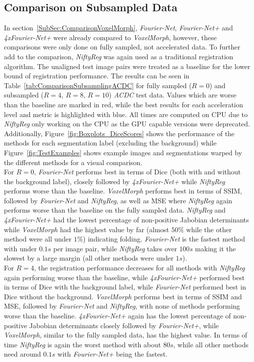 \documentclass[english,version-2022-01]{uzl-thesis} %
\begin{document}
\subsection{Comparison on Subsampled Data} \label{SubSec:ResultsComparisonSubsampling}
In section~\ref{SubSec:ComparisonVoxelMorph}, \emph{Fourier-Net}, \emph{Fourier-Net+} and \emph{4xFourier-Net+} were already compared to \emph{VoxelMorph}, however, these comparisons were only done on fully sampled, not accelerated data. To further add to the comparison, \emph{NiftyReg} was again used as a traditional registration algorithm. The unaligned test image pairs were treated as a baseline for the lower bound of registration performance. The results can be seen in Table~\ref{tab:ComparisonSubsamplingACDC} for fully sampled ($R=0$) and subsampled ($R=4$, $R=8$, $R=10$) \emph{ACDC} test data. Values which are worse than the baseline are marked in red, while the best results for each acceleration level and metric is highlighted with blue. All times are computed on CPU due to \emph{NiftyReg} only working on the CPU as the GPU capable versions were deprecated. Additionally, Figure~\ref{fig:Boxplots_DiceScores} shows the performance of the methods for each segmentation label (excluding the background) while Figure~\ref{fig:TestExamples} shows example images and segmentations warped by the different methods for a visual comparison.\\
For $R=0$, \emph{Fourier-Net} performs best in terms of Dice (both with and without the background label), closely followed by \emph{4xFourier-Net+} while \emph{NiftyReg} performs worse than the baseline. \emph{VoxelMorph} performs best in terms of SSIM, followed by \emph{Fourier-Net} and \emph{NiftyReg}, as well as MSE where \emph{NiftyReg} again performs worse than the baseline on the fully sampled data. \emph{NiftyReg} and \emph{4xFourier-Net+} had the lowest percentage of non-positive Jabobian determinants while \emph{VoxelMorph} had the highest value by far (almost $50\%$ while the other method were all under $1\%$) indicating folding. \emph{Fourier-Net} is the fastest method with under $0.1s$ per image pair, while \emph{NiftyReg} takes over $100s$ making it the slowest by a large margin (all other methods were under $1s$).\\
For $R=4$, the registration performance decreases for all methods with \emph{NiftyReg} again performing worse than the baseline, while \emph{4xFourier-Net+} performed best in terms of Dice with the background label, while \emph{Fourier-Net} performed best in Dice without the background. \emph{VoxelMorph} performs best in terms of SSIM and MSE, followed by \emph{Fourier-Net} and \emph{NiftyReg}, with none of methods performing worse than the baseline. \emph{4xFourier-Net+} again has the lowest percentage of non-positive Jabobian determinants closely followed by \emph{Fourier-Net+}, while \emph{VoxelMorph}, similar to the fully sampled data, has the highest value. In terms of time \emph{NiftyReg} is again the worst method with about $80s$, while all other methods need around $0.1s$ with \emph{Fourier-Net+} being the fastest.\\
\end{document}
